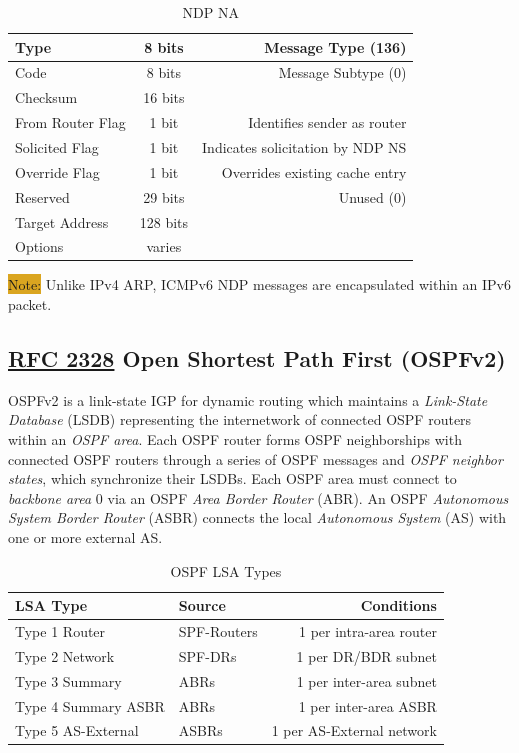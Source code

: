 \documentclass[12pt]{article}
\newcommand{\note}[1]{\colorbox{#1}{Note:}}
\newcommand{\RFC}[1]{\href{https://datatracker.ietf.org/doc/html/rfc#1}{RFC #1}}
\begin{document}
	\begin{table}[H]
	\centering
	\caption{NDP NA \label{tab:NDP NA}}
	\begin{tabular}{| l | c | r |}
	\hline
	Type				& 8 bits	& Message Type (136)\\\hline
	Code				& 8 bits	& Message Subtype (0)\\\hline
	Checksum			& 16 bits	&\\\hline
	From Router Flag		& 1 bit 	& Identifies sender as router\\\hline
	Solicited Flag		& 1 bit 	& Indicates solicitation by NDP NS\\\hline
	Override Flag		& 1 bit 	& Overrides existing cache entry\\\hline
	Reserved			& 29 bits	& Unused (0)\\\hline
	Target Address		& 128 bits	&\\\hline
	Options			& varies	&\\\hline
	\end{tabular}\end{table}
	\note{Goldenrod} Unlike IPv4 ARP, ICMPv6 NDP messages are encapsulated within an IPv6 packet.


	\subsection[RFC 2328 OSPFv2]{\RFC{2328} Open Shortest Path First (OSPFv2) \label{subsec:OSPF}}
	OSPFv2 is a link-state IGP for dynamic routing which maintains a \textit{Link-State Database} (LSDB) representing the internetwork of connected OSPF routers within an \textit{OSPF area}. Each OSPF router forms OSPF neighborships with connected OSPF routers through a series of OSPF messages and \textit{OSPF neighbor states}, which synchronize their LSDBs. Each OSPF area must connect to \textit{backbone area} 0 via an OSPF \textit{Area Border Router} (ABR). An OSPF \textit{Autonomous System Border Router} (ASBR) connects the local \textit{Autonomous System} (AS) with one or more external AS.

	\begin{table}[H]
	\centering
	\caption{OSPF LSA Types \label{tab:OSPF LSA TYPES}}
	\begin{tabular}{llr}
	\hline
	\textbf{LSA Type}		& \textbf{Source}		& \textbf{Conditions}\\\hline
	Type 1 Router		& SPF-Routers		& 1 per intra-area router\\\hline
	Type 2 Network		& SPF-DRs			& 1 per DR/BDR subnet\\\hline
	Type 3 Summary		& ABRs			& 1 per inter-area subnet\\\hline
	Type 4 Summary ASBR	& ABRs			& 1 per inter-area ASBR\\\hline
	Type 5 AS-External	& ASBRs			& 1 per AS-External network\\\hline
	\end{tabular}\end{table}
\end{document}
